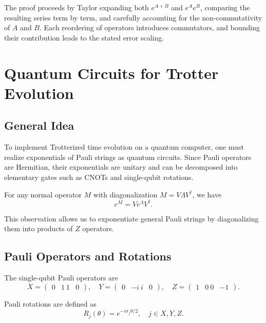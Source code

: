 \documentclass[11pt]{article}
\begin{document}
The proof proceeds by Taylor expanding both $e^{A+B}$ and $e^A e^B$, comparing the resulting series term by term, and carefully accounting for the non-commutativity of $A$ and $B$. Each reordering of operators introduces commutators, and bounding their contribution leads to the stated error scaling.

\section{Quantum Circuits for Trotter Evolution}

\subsection{General Idea}

To implement Trotterized time evolution on a quantum computer, one must realize exponentials of Pauli strings as quantum circuits. Since Pauli operators are Hermitian, their exponentials are unitary and can be decomposed into elementary gates such as CNOTs and single-qubit rotations.

For any normal operator $M$ with diagonalization $M = V \Lambda V^\dagger$, we have
\begin{equation}
  e^M = V e^{\Lambda} V^\dagger.
\end{equation}

This observation allows us to exponentiate general Pauli strings by diagonalizing them into products of $Z$ operators.

\subsection{Pauli Operators and Rotations}

The single-qubit Pauli operators are
\begin{equation}
  X = \begin{pmatrix} 0 & 1 \ 1 & 0 \end{pmatrix}, \quad
  Y = \begin{pmatrix} 0 & -i \ i & 0 \end{pmatrix}, \quad
  Z = \begin{pmatrix} 1 & 0 \ 0 & -1 \end{pmatrix}.
\end{equation}

Pauli rotations are defined as
\begin{equation}
  R_j(\theta) = e^{-i\sigma_j \theta/2}, \quad j \in {X,Y,Z}.
\end{equation}
\end{document}

